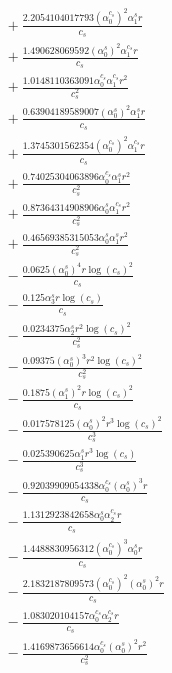 \documentclass[10pt]{article}
\begin{document}
\begin{align*}
&{}  + \frac{2.2054104017793 \left(\alpha_{0}^{c_s}\right)^{2} \alpha_{1}^s r}{c_{s}} \\
&{}  + \frac{1.490628069592 \left(\alpha_{0}^s\right)^{2} \alpha_{1}^{c_s} r}{c_{s}} \\
&{}  + \frac{1.0148110363091 \alpha_{0}^{c_s} \alpha_{1}^{c_s} r^{2}}{c_{s}^{2}} \\
&{}  + \frac{0.63904189589007 \left(\alpha_{0}^s\right)^{2} \alpha_{1}^s r}{c_{s}} \\
&{}  + \frac{1.3745301562354 \left(\alpha_{0}^{c_s}\right)^{2} \alpha_{1}^{c_s} r}{c_{s}} \\
&{}  + \frac{0.74025304063896 \alpha_{0}^{c_s} \alpha_{1}^s r^{2}}{c_{s}^{2}} \\
&{}  + \frac{0.87364314908906 \alpha_{0}^s \alpha_{1}^{c_s} r^{2}}{c_{s}^{2}} \\
&{}  + \frac{0.46569385315053 \alpha_{0}^s \alpha_{1}^s r^{2}}{c_{s}^{2}} \\
&{}  - \frac{0.0625 \left(\alpha_{0}^s\right)^{4} r \log{\left(c_{s} \right)}^{2}}{c_{s}} \\
&{}  - \frac{0.125 \alpha_{3}^s r \log{\left(c_{s} \right)}}{c_{s}} \\
&{}  - \frac{0.0234375 \alpha_{2}^s r^{2} \log{\left(c_{s} \right)}^{2}}{c_{s}^{2}} \\
&{}  - \frac{0.09375 \left(\alpha_{0}^s\right)^{3} r^{2} \log{\left(c_{s} \right)}^{2}}{c_{s}^{2}} \\
&{}  - \frac{0.1875 \left(\alpha_{1}^s\right)^{2} r \log{\left(c_{s} \right)}^{2}}{c_{s}} \\
&{}  - \frac{0.017578125 \left(\alpha_{0}^s\right)^{2} r^{3} \log{\left(c_{s} \right)}^{2}}{c_{s}^{3}} \\
&{}  - \frac{0.025390625 \alpha_{1}^s r^{3} \log{\left(c_{s} \right)}}{c_{s}^{3}} \\
&{}  - \frac{0.92039909054338 \alpha_{0}^{c_s} \left(\alpha_{0}^s\right)^{3} r}{c_{s}} \\
&{}  - \frac{1.1312923842658 \alpha_{0}^s \alpha_{2}^{c_s} r}{c_{s}} \\
&{}  - \frac{1.4488830956312 \left(\alpha_{0}^{c_s}\right)^{3} \alpha_{0}^s r}{c_{s}} \\
&{}  - \frac{2.1832187809573 \left(\alpha_{0}^{c_s}\right)^{2} \left(\alpha_{0}^s\right)^{2} r}{c_{s}} \\
&{}  - \frac{1.083020104157 \alpha_{0}^{c_s} \alpha_{2}^{c_s} r}{c_{s}} \\
&{}  - \frac{1.4169873656614 \alpha_{0}^{c_s} \left(\alpha_{0}^s\right)^{2} r^{2}}{c_{s}^{2}} \\

\end{align*}
\end{document}
